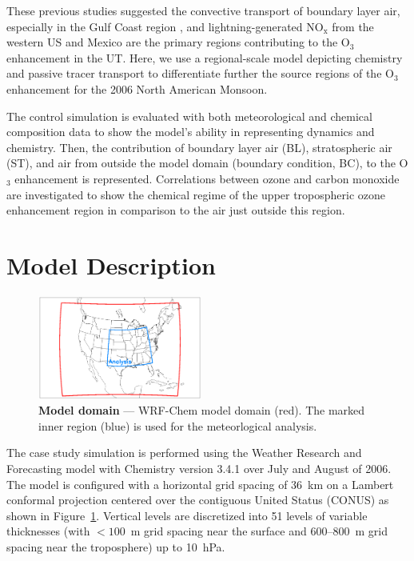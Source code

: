These previous studies suggested the convective transport of boundary layer air, especially in the
Gulf Coast region \citep{Li:2005ss}, and lightning-generated $\mathrm{NO_x}$ from the western US and Mexico
are the primary regions contributing to the O$_3$ enhancement in the UT. Here, we use a regional-scale
model depicting chemistry and passive tracer transport to differentiate further the source regions of the O$_3$ enhancement
for the 2006 North American Monsoon.

The control simulation is evaluated with both meteorological and chemical composition data to show the
model's ability in representing dynamics and chemistry. Then,
the contribution of boundary layer air (BL), stratospheric air (ST), and air from outside the model domain
(boundary condition, BC), to the O$_3$ enhancement is represented. Correlations between ozone and carbon
monoxide are investigated to show the chemical regime of the upper tropospheric ozone enhancement region
in comparison to the air just outside this region.

\section{Model Description}\label{sect:setup}

\begin{figure}
	\centering
	\vspace{-.4in}
	\begin{singlespacing}
	\includegraphics[width=0.48\textwidth]{Figures/domain.eps}
	\caption[Model domain]{{\small\textbf{Model domain} --- WRF-Chem model domain (red). The marked inner region (blue)
	is used for the meteorlogical analysis.}}
	\label{fig:domain}
	\end{singlespacing}
\end{figure}

The case study simulation is performed using the Weather Research and Forecasting model
\citep{Skamarock:2008xx} with Chemistry \citep[WRF-Chem;][]{Grell:2005fv} version 3.4.1
over July and August of 2006. The model is configured with a horizontal grid spacing of 36~km
on a Lambert conformal projection centered over the contiguous United Status (CONUS) as
shown in Figure~\ref{fig:domain}. Vertical levels are discretized into 51 levels of variable thicknesses
(with $<100$~m grid spacing near the surface and 600--800~m grid spacing near the troposphere) up to 10~hPa.


